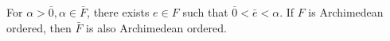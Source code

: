 For $\alpha > \bar{0}, \alpha \in \bar{F}$, there exists $e \in F$ such that $\bar{0} < \bar{e} < \alpha$. If $F$ is Archimedean ordered, then $\bar{F}$ is also Archimedean ordered.
